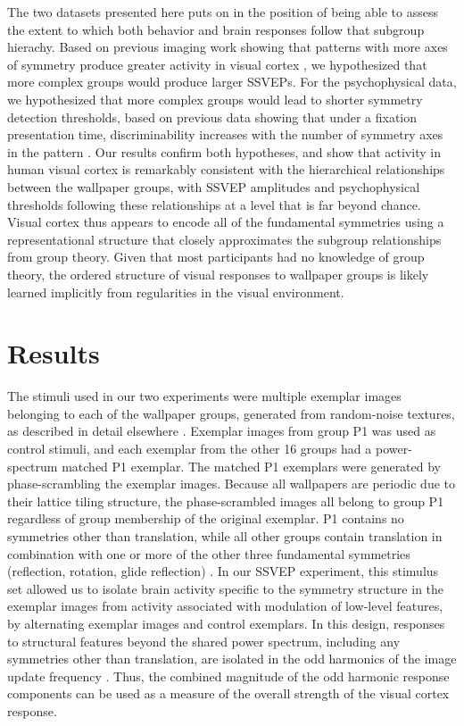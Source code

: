 \documentclass[9pt,twocolumn,twoside,lineno]{pnas-new}
\begin{document}
The two datasets presented here puts on in the position of being able to assess the extent to which both behavior and brain responses follow that subgroup hierachy. Based on previous imaging work showing that patterns with more axes of symmetry produce greater activity in visual cortex \cite{RN1170, RN1959, RN1725, keefe_2018}, we hypothesized that more complex groups would produce larger SSVEPs. For the psychophysical data, we hypothesized that more complex groups would lead to shorter symmetry detection thresholds, based on previous data showing that under a fixation presentation time, discriminability increases with the number of symmetry axes in the pattern \cite{wagemans_1991}. Our results confirm both hypotheses, and show that activity in human visual cortex is remarkably consistent with the hierarchical relationships between the wallpaper groups, with SSVEP amplitudes and psychophysical thresholds following these relationships at a level that is far beyond chance. Visual cortex thus appears to encode all of the fundamental symmetries using a representational structure that closely approximates the subgroup relationships from group theory. Given that most participants had no knowledge of group theory, the ordered structure of visual responses to wallpaper groups is likely learned implicitly from regularities in the visual environment.

\section*{Results}

The stimuli used in our two experiments were multiple exemplar images belonging to each of the wallpaper groups, generated from random-noise textures, as described in detail elsewhere \cite{RN1725}. Exemplar images from group P1 was used as control stimuli, and each exemplar from the other 16 groups had a power-spectrum matched P1 exemplar. The matched P1 exemplars were generated by phase-scrambling the exemplar images. Because all wallpapers are periodic due to their lattice tiling structure, the phase-scrambled images all belong to group P1 regardless of group membership of the original exemplar. P1 contains no symmetries other than translation, while all other groups contain translation in combination with one or more of the other three fundamental symmetries (reflection, rotation, glide reflection) \cite{RN1425}. In our SSVEP experiment, this stimulus set allowed us to isolate brain activity specific to the symmetry structure in the exemplar images from activity associated with modulation of low-level features, by alternating exemplar images and control exemplars. In this design, responses to structural features beyond the shared power spectrum, including any symmetries other than translation, are isolated in the odd harmonics of the image update frequency \cite{RN1725,RN1540, RN1954}. Thus, the combined magnitude of the odd harmonic response components can be used as a measure of the overall strength of the visual cortex response.
\end{document}
